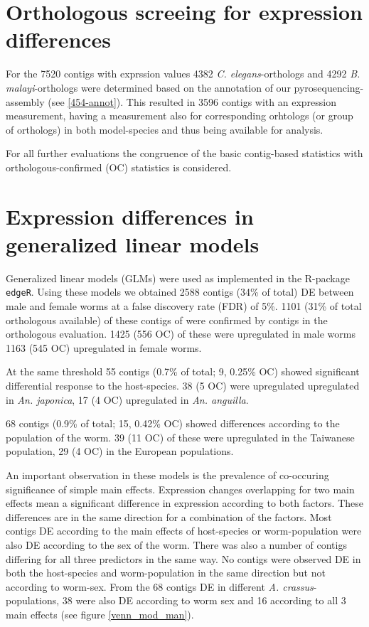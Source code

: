 \section{Orthologous screeing for expression differences}

For the 7520 contigs with exprssion values 4382
\textit{C. elegans}-orthologs and 4292 \textit{B. malayi}-orthologs
were determined based on the annotation of our pyrosequencing-assembly
(see \ref{454-annot}). This resulted in 3596 contigs with an
expression measurement, having a measurement also for corresponding
orhtologs (or group of orthologs) in both model-species and thus being
available for analysis.

For all further evaluations the congruence of the basic contig-based
statistics with orthologous-confirmed (OC) statistics is considered.

\section{Expression differences in generalized linear models}

Generalized linear models (GLMs) were used as implemented in the
R-package \texttt{edgeR}. Using these models we obtained 2588 contigs
(34\% of total) DE between male and female worms at a false discovery
rate (FDR) of 5\%. 1101 (31\% of total orthologous available) of these
contigs of were confirmed by contigs in the orthologous
evaluation. 1425 (556 OC) of these were upregulated in male worms 1163
(545 OC) upregulated in female worms.

At the same threshold 55 contigs (0.7\% of total; 9, 0.25\% OC) showed
significant differential response to the host-species. 38 (5 OC) were
upregulated upregulated in \textit{An. japonica}, 17 (4 OC)
upregulated in \textit{An. anguilla}.

68 contigs (0.9\% of total; 15, 0.42\% OC) showed differences
according to the population of the worm. 39 (11 OC) of these were
upregulated in the Taiwanese population, 29 (4 OC) in the European
populations.

An important observation in these models is the prevalence of
co-occuring significance of simple main effects. Expression changes
overlapping for two main effects mean a significant difference in
expression according to both factors. These differences are in the
same direction for a combination of the factors. Most contigs DE
according to the main effects of host-species or worm-population were
also DE according to the sex of the worm. There was also a number of
contigs differing for all three predictors in the same way. No contigs
were observed DE in both the host-species and worm-population in the
same direction but not according to worm-sex. From the 68 contigs DE
in different \textit{A. crassus}-populations, 38 were also DE
according to worm sex and 16 according to all 3 main effects (see
figure \ref{venn_mod_man}).

